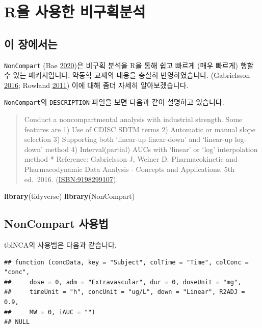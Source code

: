 \documentclass[
  12pt,
]{krantz}
\newenvironment{Shaded}{\begin{snugshade}}{\end{snugshade}}
\newcommand{\KeywordTok}[1]{\textcolor[rgb]{0.13,0.29,0.53}{\textbf{#1}}}
\newcommand{\NormalTok}[1]{#1}
\begin{document}
\hypertarget{noncompart}{%
\chapter{R을 사용한 비구획분석}\label{noncompart}}

\hypertarget{summary-noncompart}{%
\section{이 장에서는}\label{summary-noncompart}}

\texttt{NonCompart} (Bae \protect\hyperlink{ref-R-NonCompart}{2020})은 비구획 분석을 R을 통해 쉽고 빠르게 (매우 빠르게) 행할 수 있는 패키지입니다.
약동학 교재의 내용을 충실히 반영하였습니다. (Gabrielsson \protect\hyperlink{ref-gab}{2016}; Rowland \protect\hyperlink{ref-tozer}{2011})
이에 대해 좀더 자세히 알아보겠습니다.

\texttt{NonCompart}의 \texttt{DESCRIPTION} 파일을 보면 다음과 같이 설명하고 있습니다.

\begin{quote}
Conduct a noncompartmental analysis with industrial strength.
Some features are
1) Use of CDISC SDTM terms
2) Automatic or manual slope selection
3) Supporting both `linear-up linear-down' and `linear-up log-down' method
4) Interval(partial) AUCs with `linear' or `log' interpolation method
* Reference: Gabrielsson J, Weiner D. Pharmacokinetic and Pharmacodynamic Data Analysis - Concepts and Applications. 5th ed.~2016. (\url{ISBN:9198299107}).
\end{quote}

\begin{Shaded}
\begin{Highlighting}[]
\KeywordTok{library}\NormalTok{(tidyverse)}
\KeywordTok{library}\NormalTok{(NonCompart)}
\end{Highlighting}
\end{Shaded}

\hypertarget{how-to-use}{%
\section{NonCompart 사용법}\label{how-to-use}}

tblNCA의 사용법은 다음과 같습니다.

\begin{verbatim}
## function (concData, key = "Subject", colTime = "Time", colConc = "conc", 
##     dose = 0, adm = "Extravascular", dur = 0, doseUnit = "mg", 
##     timeUnit = "h", concUnit = "ug/L", down = "Linear", R2ADJ = 0.9, 
##     MW = 0, iAUC = "") 
## NULL
\end{verbatim}
\end{document}
